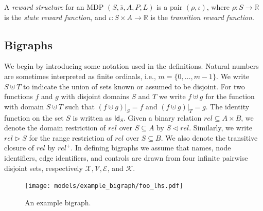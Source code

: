 \documentclass[runningheads]{llncs}
\newcommand\Id{\mathsf{Id}}
\begin{document}
\begin{definition}
  A \emph{reward structure} for an MDP $(S, \overline{s}, A, P, L)$ is a pair
  $(\rho, \iota)$, where $\rho : S \to \mathbb{R}$ is the \emph{state reward
    function}, and $\iota : S \times A \to \mathbb{R}$ is the \emph{transition
    reward function}.
\end{definition}

\subsection{Bigraphs}

We begin by introducing some notation used in the definitions. Natural numbers
are sometimes interpreted as finite ordinals, i.e., $m = \{ 0, \dots, m - 1 \}$.
We write $S \uplus T$ to indicate the union of sets known or assumed to be
disjoint. For two functions $f$ and $g$ with disjoint domains $S$ and $T$ we
write $f \uplus g$ for the function with domain $S \uplus T$ such that $(f
\uplus g)|_S = f$ and $(f \uplus g)|_T = g$. The identity function on the set
$S$ is written as $\Id_S$. Given a binary relation $\mathit{rel} \subseteq A
\times B$, we denote the domain restriction of $\mathit{rel}$ over $S \subseteq
A$ by $S \lhd \mathit{rel}$. Similarly, we write $\mathit{rel} \rhd S$ for the
range restriction of $\mathit{rel}$ over $S \subseteq B$. We also denote the
transitive closure of $\mathit{rel}$ by $\mathit{rel}^+$. In defining bigraphs
we assume that names, node identifiers, edge identifiers, and controls are drawn
from four infinite pairwise disjoint sets, respectively $\mathcal{X},
\mathcal{V}, \mathcal{E}$, and $\mathcal{K}$.

\begin{figure}
  \centering
  \texttt{[image: models/example\_bigraph/foo\_lhs.pdf]}
  \caption{An example bigraph.}
  \label{example_bigraph}
\end{figure}
\end{document}
